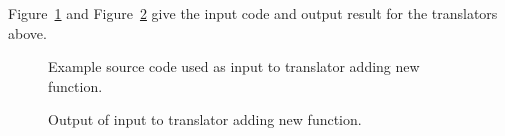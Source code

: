 Figure~\ref{Tutorial:exampleInputCode_AddFunctionDeclaration} and 
Figure~\ref{Tutorial:exampleOutput_AddFunctionDeclaration} 
give the input code and output result for the
translators above.

\begin{figure}[!h]
{\indent
{\mySmallFontSize


\begin{latexonly}
   
\end{latexonly}

\begin{htmlonly}
   
\end{htmlonly}

}
}
\caption{Example source code used as input to translator adding new function.}
\label{Tutorial:exampleInputCode_AddFunctionDeclaration}
\end{figure}

\begin{figure}[!h]
{\indent
{\mySmallFontSize


\begin{latexonly}
   
\end{latexonly}

\begin{htmlonly}
   
\end{htmlonly}

}
}
\caption{Output of input to translator adding new function.}
\label{Tutorial:exampleOutput_AddFunctionDeclaration}
\end{figure}


\clearpage
